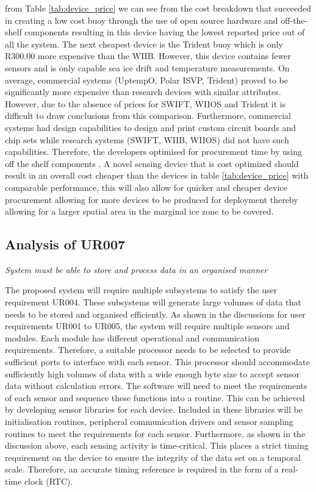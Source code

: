 from Table \ref{tab:device_price} we can see from the cost breakdown that \textcite{rabault2019open} succeeded in creating a low cost buoy through the use of open source hardware and off-the-shelf components resulting in this device having the lowest reported price out of all the system. The next cheapest device is the Trident buoy which is only R300.00 more expensive than the WIIB. However, this device contains fewer sensors and is only capable sea ice drift and temperature measurements. On average, commercial systems (UptempO, Polar ISVP, Trident) proved to be significantly more expensive than research devices with similar attributes. However, due to the absence of prices for SWIFT, WIIOS and Trident it is difficult to draw conclusions from this comparison. Furthermore, commercial systems had design capabilities to design and print custom circuit boards and chip sets while research systems (SWIFT, WIIB, WIIOS) did not have such capabilities. Therefore, the developers optimised for procurement time by using off the shelf components \cite{kohout2015device,rabault2019open}. A novel sensing device that is cost optimized should result in an overall cost cheaper than the devices in table \ref{tab:device_price} with comparable performance, this will also allow for quicker and cheaper device procurement allowing for more devices to be produced for deployment thereby allowing for a larger spatial area in the marginal ice zone to be covered.

\subsection{Analysis of UR007}

\textit{System must be able to store and process data in an organised manner}

The proposed system will require multiple subsystems to satisfy the user requirement UR004. These subsystems will generate large volumes of data that needs to be stored and organised efficiently. As shown in the discussions for user requirements UR001 to UR005, the system will require multiple sensors and modules. Each module has different operational and communication requirements. Therefore, a suitable processor needs to be selected to provide sufficient ports to interface with each sensor. This processor should accommodate sufficiently high volumes of data with a wide enough byte size to accept sensor data without calculation errors. The software will need to meet the requirements of each sensor and sequence these functions into a routine. This can be achieved by developing sensor libraries for each device. Included in these libraries will be initialisation routines, peripheral communication drivers and sensor sampling routines to meet the requirements for each sensor. Furthermore, as shown in the discussion above, each sensing activity is time-critical. This places a strict timing requirement on the device to ensure the integrity of the data set on a temporal scale. Therefore, an accurate timing reference is required in the form of a real-time clock (RTC). \par 

